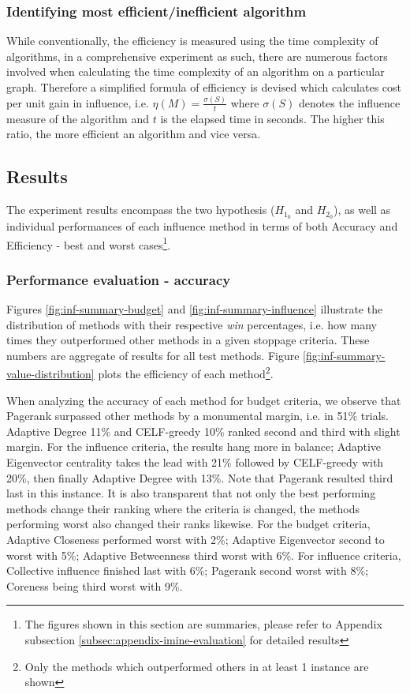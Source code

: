 			\subsubsection{Identifying most efficient/inefficient algorithm}
			While conventionally, the efficiency is measured using the time complexity of algorithms, in a comprehensive experiment as such, there are numerous factors involved when calculating the time complexity of an algorithm on a particular graph. Therefore a simplified formula of efficiency is devised which calculates cost per unit gain in influence, i.e. $\eta(M)=\frac{\sigma(S)}{t}$ where $\sigma(S)$ denotes the influence measure of the algorithm and $t$ is the elapsed time in seconds. The higher this ratio, the more efficient an algorithm and vice versa.
			
		\subsection{Results}
		The experiment results encompass the two hypothesis ($H_{1_0}$ and $H_{2_0}$), as well as individual performances of each influence method in terms of both Accuracy and Efficiency - best and worst cases\footnote{The figures shown in this section are summaries, please refer to Appendix subsection \ref{subsec:appendix-imine-evaluation} for detailed results}.
	
			\subsubsection{Performance evaluation - accuracy}
			Figures \ref{fig:inf-summary-budget} and \ref{fig:inf-summary-influence} illustrate the distribution of methods with their respective \textit{win} percentages, i.e. how many times they outperformed other methods in a given stoppage criteria. These numbers are aggregate of results for all test methods. Figure \ref{fig:inf-summary-value-distribution} plots the efficiency of each method\footnote{Only the methods which outperformed others in at least 1 instance are shown}.
			
			When analyzing the accuracy of each method for budget criteria, we observe that Pagerank surpassed other methods by a monumental margin, i.e. in 51\% trials. Adaptive Degree 11\% and CELF-greedy 10\% ranked second and third with slight margin. For the influence criteria, the results hang more in balance; Adaptive Eigenvector centrality takes the lead with 21\% followed by CELF-greedy with 20\%, then finally Adaptive Degree with 13\%. Note that Pagerank resulted third last in this instance. It is also transparent that not only the best performing methods change their ranking where the criteria is changed, the methods performing worst also changed their ranks likewise. For the budget criteria, Adaptive Closeness performed worst with 2\%; Adaptive Eigenvector second to worst with 5\%; Adaptive Betweenness third worst with 6\%. For influence criteria, Collective influence finished last with 6\%; Pagerank second worst with 8\%; Coreness being third worst with 9\%.
			
